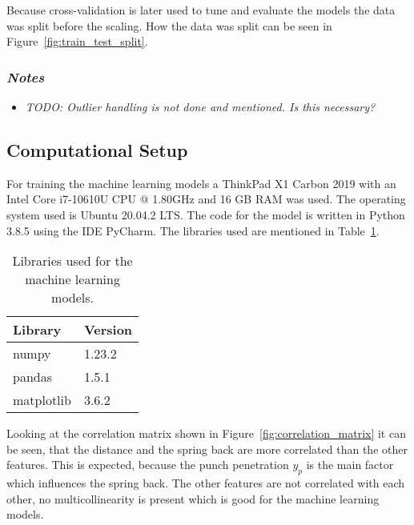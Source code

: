 Because cross-validation is later used to tune and evaluate the models the data was split before the scaling. How the
data was split can be seen in Figure~\ref{fig:train_test_split}.

\subsubsection*{\textit{Notes}}
\begin{itemize}
    \item \textit{TODO: Outlier handling is not done and mentioned. Is this necessary?}
\end{itemize}



\subsection{Computational Setup}
For training the machine learning models a ThinkPad X1 Carbon 2019 with an Intel Core i7-10610U CPU @ 1.80GHz and 16
GB RAM was used. The operating system used is Ubuntu 20.04.2 LTS. The code for the model is written in Python 3.8.5
using the IDE PyCharm. The libraries used are mentioned in Table~\ref{table:libraries}.

\captionsetup{width=1\textwidth}

\begin{table}[H]
    \centering
    \begin{tabular}{|ll|}
        \hline
        \textbf{Library} & \textbf{Version} \\
        \hline
        numpy            & 1.23.2           \\
        pandas           & 1.5.1            \\
        matplotlib       & 3.6.2            \\ \hline
    \end{tabular}
    \caption{Libraries used for the machine learning models.}
    \label{table:libraries}
\end{table}

Looking at the correlation matrix shown in Figure~\ref*{fig:correlation_matrix} it can be seen, that the distance and
the spring back are more correlated than the other features. This is expected, because the punch penetration $y_p$ is
the main factor which influences the spring back. The other features are not correlated with each other, no
multicollinearity is present which is good for the machine learning models.

